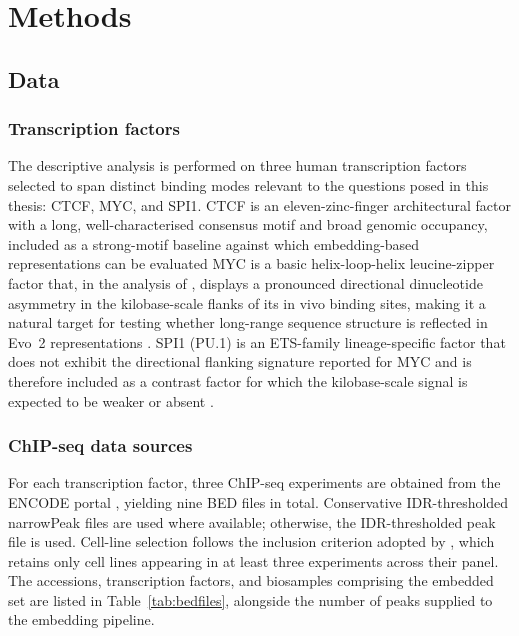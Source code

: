 \shorthandoff{-} 

\chapter{Methods}

\section{Data}

\subsection{Transcription factors}

The descriptive analysis is performed on three human transcription factors selected to span distinct binding modes relevant to the questions posed in this thesis: CTCF, MYC, and SPI1.
CTCF is an eleven-zinc-finger architectural factor with a long, well-characterised consensus motif and broad genomic occupancy, included as a strong-motif baseline against which embedding-based representations can be evaluated \cite{ongCTCFArchitecturalProtein2014}
MYC is a basic helix-loop-helix leucine-zipper factor that, in the analysis of \citet{faltejskovaNonconsensusFlankingSequence2026a}, displays a pronounced directional dinucleotide asymmetry in the kilobase-scale flanks of its in vivo binding sites, making it a natural target for testing whether long-range sequence structure is reflected in Evo~2 representations \cite{luscherRegulationGeneTranscription2012a}.
SPI1 (PU.1) is an ETS-family lineage-specific factor that does not exhibit the directional flanking signature reported for MYC and is therefore included as a contrast factor for which the kilobase-scale signal is expected to be weaker or absent \cite{rothenbergMechanismsActionHematopoietic2019}.

\subsection{ChIP-seq data sources}
\label{sec:chip-data} %

For each transcription factor, three ChIP-seq experiments are obtained from the ENCODE portal \cite{dunhamIntegratedEncyclopediaDNA2012}, yielding nine BED files in total.
Conservative IDR-thresholded narrowPeak files \cite{liMeasuringReproducibilityHighthroughput2011} are used where available; otherwise, the IDR-thresholded peak file is used.
Cell-line selection follows the inclusion criterion adopted by \citet{faltejskovaNonconsensusFlankingSequence2026a}, which retains only cell lines appearing in at least three experiments across their panel.
The accessions, transcription factors, and biosamples comprising the embedded set are listed in Table~\ref{tab:bedfiles}, alongside the number of peaks supplied to the embedding pipeline.

